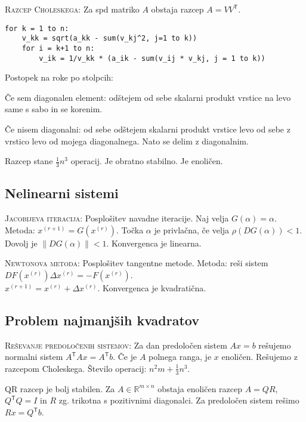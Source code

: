 \documentclass[a4paper,10pt]{article}
\theoremstyle{definition}
\def\R{\mathbb{R}}
\newenvironment{enumerate*}%
{
\vspace{-6pt}
\begin{enumerate}
\setlength{\itemsep}{0pt}
\setlength{\parskip}{2pt}
}
{\end{enumerate}}
\newcommand{\T}{\mathsf{T}\!}
\begin{document}
\textsc{Razcep Choleskega:}
Za spd matriko $A$ obstaja razcep $A = VV^\T$.
\scriptsize
\begin{verbatim}
for k = 1 to n:
    v_kk = sqrt(a_kk - sum(v_kj^2, j=1 to k))
    for i = k+1 to n:
        v_ik = 1/v_kk * (a_ik - sum(v_ij * v_kj, j = 1 to k))
\end{verbatim}
\normalsize
Postopek na roke po stolpcih:
\begin{enumerate*}
  \item Če sem diagonalen element: odštejem od sebe skalarni produkt vrstice na
    levo same s sabo in se korenim.
  \item Če nisem diagonalni: od sebe odštejem skalarni produkt vrstice levo od
    sebe z vrstico levo od mojega diagonalnega. Nato se delim z
    diagonalnim.
\end{enumerate*}

Razcep stane $\frac13n^3$ operacij. Je obratno stabilno. Je enoličen.

\subsection*{Nelinearni sistemi}

\textsc{Jacobijeva iteracija:}
Posplošitev navadne iteracije. Naj velja $G(\alpha)= \alpha$. Metoda: $x^{(r+1)}
= G(x^{(r)})$. Točka $\alpha$ je privlačna, če velja $\rho(DG(\alpha)) < 1$.
Dovolj je $\|DG(\alpha)\| < 1$.  Konvergenca je linearna.

\textsc{Newtonova metoda:}
Posplošitev tangentne metode. Metoda: reši sistem $DF(x^{(r)})\Delta x^{(r)} =
-F(x^{(r)})$. \\ $x^{(r+1)} = x^{(r)} + \Delta x^{(r)}$. Konvergenca je
kvadratična.

\subsection*{Problem najmanjših kvadratov}

\textsc{Reševanje predoločenih sistemov:} Za dan predoločen sistem $Ax=b$
rešujemo normalni sistem $A^\T Ax=A^\T b$. Če je $A$ polnega ranga, je $x$ enoličen.
Rešujemo z razcepom Choleskega. Število operacij: $n^2m + \frac13n^3$.

QR razcep je bolj stabilen. Za $A \in \R^{m\times n}$ obstaja enoličen razcep $A
= QR$, $Q^\T Q = I$ in $R$ zg. trikotna s pozitivnimi diagonalci. Za predoločen
sistem rešimo $Rx = Q^\T b$.
\end{document}
